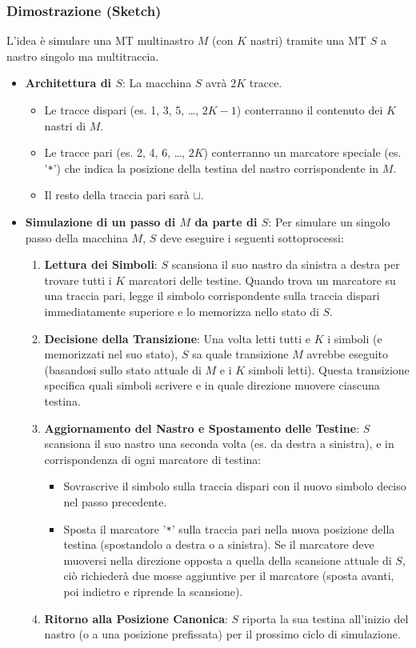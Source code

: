 \documentclass[a4paper]{article}
\begin{document}
\subsubsection{Dimostrazione (Sketch)}
L'idea è simulare una MT multinastro $M$ (con $K$ nastri) tramite una MT $S$ a nastro singolo ma multitraccia.
\begin{itemize}
    \item \textbf{Architettura di $S$}: La macchina $S$ avrà $2K$ tracce.
        \begin{itemize}
            \item Le tracce dispari (es. 1, 3, 5, \dots, $2K-1$) conterranno il contenuto dei $K$ nastri di $M$.
            \item Le tracce pari (es. 2, 4, 6, \dots, $2K$) conterranno un marcatore speciale (es. '\texttt{*}') che indica la posizione della testina del nastro corrispondente in $M$.
            \item Il resto della traccia pari sarà $\sqcup$.
        \end{itemize}
    \item \textbf{Simulazione di un passo di $M$ da parte di $S$}: Per simulare un singolo passo della macchina $M$, $S$ deve eseguire i seguenti sottoprocessi:
        \begin{enumerate}
            \item \textbf{Lettura dei Simboli}: $S$ scansiona il suo nastro da sinistra a destra per trovare tutti i $K$ marcatori delle testine. Quando trova un marcatore su una traccia pari, legge il simbolo corrispondente sulla traccia dispari immediatamente superiore e lo memorizza nello stato di $S$.
            \item \textbf{Decisione della Transizione}: Una volta letti tutti e $K$ i simboli (e memorizzati nel suo stato), $S$ sa quale transizione $M$ avrebbe eseguito (basandosi sullo stato attuale di $M$ e i $K$ simboli letti). Questa transizione specifica quali simboli scrivere e in quale direzione muovere ciascuna testina.
            \item \textbf{Aggiornamento del Nastro e Spostamento delle Testine}: $S$ scansiona il suo nastro una seconda volta (es. da destra a sinistra), e in corrispondenza di ogni marcatore di testina:
                \begin{itemize}
                    \item Sovrascrive il simbolo sulla traccia dispari con il nuovo simbolo deciso nel passo precedente.
                    \item Sposta il marcatore '\texttt{*}' sulla traccia pari nella nuova posizione della testina (spostandolo a destra o a sinistra). Se il marcatore deve muoversi nella direzione opposta a quella della scansione attuale di $S$, ciò richiederà due mosse aggiuntive per il marcatore (sposta avanti, poi indietro e riprende la scansione).
                \end{itemize}
            \item \textbf{Ritorno alla Posizione Canonica}: $S$ riporta la sua testina all'inizio del nastro (o a una posizione prefissata) per il prossimo ciclo di simulazione.
        \end{enumerate}
\end{itemize}
\end{document}
